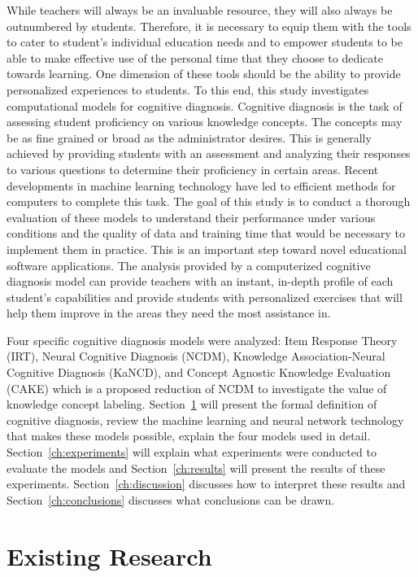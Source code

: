 \documentclass[letterpaper, 12pt, captions=tableabove]{scrreprt}
\begin{document}
	While teachers will always be an invaluable resource, they will also always be outnumbered by students. Therefore, it is necessary to equip them with the tools to cater to student's individual education needs and to empower students to be able to make effective use of the personal time that they choose to dedicate towards learning. One dimension of these tools should be the ability to provide personalized experiences to students. To this end, this study investigates computational models for cognitive diagnosis. Cognitive diagnosis is the task of assessing student proficiency on various knowledge concepts. The concepts may be as fine grained or broad as the administrator desires.
This is generally achieved by providing students with an assessment and analyzing their responses to various questions to determine their proficiency in certain areas. Recent developments in machine learning technology have led to efficient methods for computers to complete this task. The goal of this study is to conduct a thorough evaluation of these models to understand their performance under various conditions and the quality of data and training time that would be necessary to implement them in practice. This is an important step toward novel educational software applications. The analysis provided by a computerized cognitive diagnosis model can provide teachers with an instant, in-depth profile of each student's capabilities and provide students with personalized exercises that will help them improve in the areas they need the most assistance in.

	Four specific cognitive diagnosis models were analyzed: Item Response Theory (IRT), Neural Cognitive Diagnosis (NCDM), Knowledge Association-Neural Cognitive Diagnosis (KaNCD), and Concept Agnostic Knowledge Evaluation (CAKE) which is a proposed reduction of NCDM to investigate the value of knowledge concept labeling.  Section~\ref{ch:background} will present the formal definition of cognitive diagnosis, review the machine learning and neural network technology that makes these models possible, explain the four models used in detail.  Section~\ref{ch:experiments} will explain what experiments were conducted to evaluate the models and Section~\ref{ch:results} will present the results of these experiments. Section~\ref{ch:discussion} discusses how to interpret these results and Section~\ref{ch:conclusions} discusses what conclusions can be drawn.



\chapter{Existing Research}
\label{ch:background}
	
\end{document}
